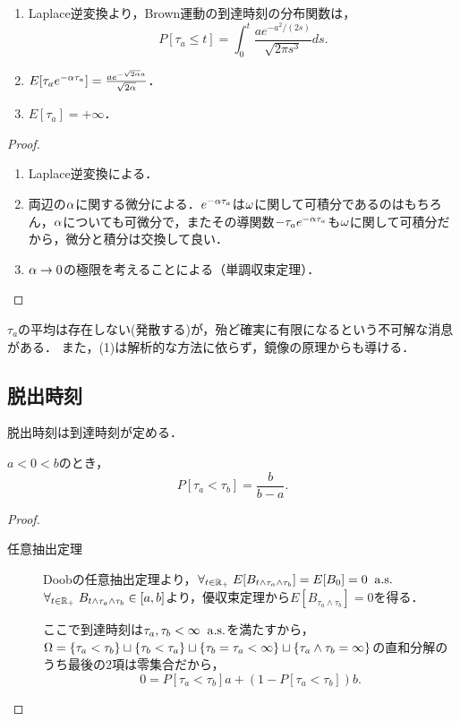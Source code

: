 \documentclass[uplatex,dvipdfmx]{jsreport}
\begin{document}
\begin{corollary}[到達時刻の分布]\mbox{}
    \begin{enumerate}
        \item Laplace逆変換より，Brown運動の到達時刻の分布関数は，
        \[P[\tau_a\le t]=\int^t_0\frac{ae^{-a^2/(2s)}}{\sqrt{2\pi s^3}}ds.\]
        \item $E[\tau_ae^{-\alpha\tau_a}]=\frac{ae^{-\sqrt{2\alpha}a}}{\sqrt{2\alpha}}$．
        \item $E[\tau_a]=+\infty$．
    \end{enumerate}
\end{corollary}
\begin{proof}\mbox{}
    \begin{enumerate}
        \item Laplace逆変換による．
        \item 両辺の$\alpha$に関する微分による．$e^{-\alpha\tau_a}$は$\omega$に関して可積分であるのはもちろん，$\alpha$についても可微分で，またその導関数$-\tau_ae^{-\alpha\tau_a}$も$\omega$に関して可積分だから，微分と積分は交換して良い．
        \item $\alpha\to0$の極限を考えることによる（単調収束定理）．
    \end{enumerate}
\end{proof}
\begin{remarks}
    $\tau_a$の平均は存在しない(発散する)が，殆ど確実に有限になるという不可解な消息がある．
    また，(1)は解析的な方法に依らず，鏡像の原理からも導ける．
\end{remarks}

\subsection{脱出時刻}

\begin{tcolorbox}[colframe=ForestGreen, colback=ForestGreen!10!white,breakable,colbacktitle=ForestGreen!40!white,coltitle=black,fonttitle=\bfseries\sffamily,
title=]
    脱出時刻は到達時刻が定める．
\end{tcolorbox}

\begin{proposition}[どっちの端から脱出するかの確率]
    $a<0<b$のとき，
    \[P[\tau_a<\tau_b]=\frac{b}{b-a}.\]
\end{proposition}
\begin{proof}\mbox{}
    \begin{description}
        \item[任意抽出定理] Doobの任意抽出定理より，$\forall_{t\in\mathbb{R}_+}\;E[B_{t\land\tau_a\land\tau_b}]=E[B_0]=0\;\;\mathrm{a.s.}$
        $\forall_{t\in\mathbb{R}_+}\;B_{t\land\tau_a\land\tau_b}\in[a,b]$より，優収束定理から$E[B_{\tau_a\land\tau_b}]=0$を得る．

        ここで到達時刻は$\tau_a,\tau_b<\infty\;\;\mathrm{a.s.}$を満たすから，$\Omega=\left\{\tau_a<\tau_b\right\}\sqcup\left\{\tau_b<\tau_a\right\}\sqcup\left\{\tau_b=\tau_a<\infty\right\}\sqcup\left\{\tau_a\land\tau_b=\infty\right\}$の直和分解のうち最後の2項は零集合だから，
        \[0=P[\tau_a<\tau_b]a+(1-P[\tau_a<\tau_b])b.\]
    \end{description}
\end{proof}
\end{document}
